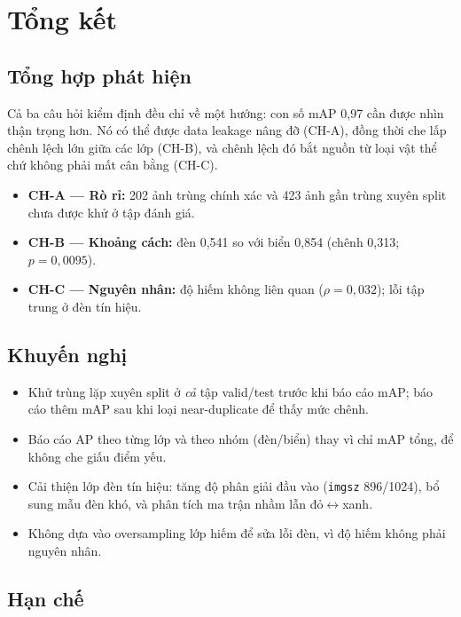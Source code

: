 \chapter{Tổng kết}
\label{ch:tongket}

\section{Tổng hợp phát hiện}

Cả ba câu hỏi kiểm định đều chỉ về một hướng: con số mAP 0,97 cần được nhìn thận trọng hơn.
Nó có thể được data leakage nâng đỡ (CH-A), đồng thời che lấp chênh lệch lớn giữa các lớp
(CH-B), và chênh lệch đó bắt nguồn từ loại vật thể chứ không phải mất cân bằng (CH-C).

\begin{itemize}
  \item \textbf{CH-A --- Rò rỉ:} 202 ảnh trùng chính xác và 423 ảnh gần trùng xuyên split chưa
  được khử ở tập đánh giá.
  \item \textbf{CH-B --- Khoảng cách:} đèn 0,541 so với biển 0,854 (chênh 0,313; $p = 0{,}0095$).
  \item \textbf{CH-C --- Nguyên nhân:} độ hiếm không liên quan ($\rho = 0{,}032$); lỗi tập trung
  ở đèn tín hiệu.
\end{itemize}

\section{Khuyến nghị}

\begin{itemize}
  \item Khử trùng lặp xuyên split ở \emph{cả} tập valid/test trước khi báo cáo mAP; báo cáo thêm
  mAP sau khi loại near-duplicate để thấy mức chênh.
  \item Báo cáo AP theo từng lớp và theo nhóm (đèn/biển) thay vì chỉ mAP tổng, để không che giấu
  điểm yếu.
  \item Cải thiện lớp đèn tín hiệu: tăng độ phân giải đầu vào (\texttt{imgsz} 896/1024), bổ sung
  mẫu đèn khó, và phân tích ma trận nhầm lẫn đỏ$\leftrightarrow$xanh.
  \item Không dựa vào oversampling lớp hiếm để sửa lỗi đèn, vì độ hiếm không phải nguyên nhân.
\end{itemize}

\section{Hạn chế}


